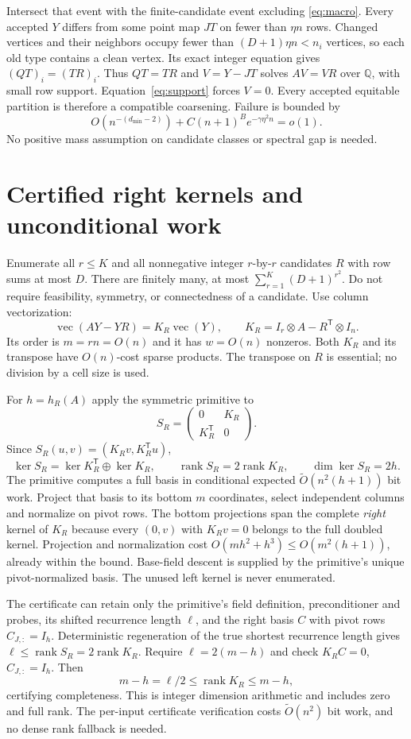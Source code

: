 \documentclass[11pt]{article}
\newcommand{\rank}{\operatorname{rank}}
\begin{document}
Intersect that event with the finite-candidate event excluding \eqref{eq:macro}. Every accepted $Y$ differs from some point map $JT$ on fewer than $\eta n$ rows. Changed vertices and their neighbors occupy fewer than $(D+1)\eta n<n_i$ vertices, so each old type contains a clean vertex. Its exact integer equation gives $(QT)_i=(TR)_i$. Thus $QT=TR$ and $V=Y-JT$ solves $AV=VR$ over $\mathbb Q$, with small row support. Equation~\eqref{eq:support} forces $V=0$. Every accepted equitable partition is therefore a compatible coarsening. Failure is bounded by
\[
 O(n^{-(d_{\min}-2)})+C(n+1)^B e^{-\gamma\eta^2n}=o(1).
\]
No positive mass assumption on candidate classes or spectral gap is needed.

\section{Certified right kernels and unconditional work}
Enumerate all $r\le K$ and all nonnegative integer $r$-by-$r$ candidates $R$ with row sums at most $D$. There are finitely many, at most $\sum_{r=1}^K(D+1)^{r^2}$. Do not require feasibility, symmetry, or connectedness of a candidate. Use column vectorization:
\[
 \operatorname{vec}(AY-YR)=K_R\operatorname{vec}(Y),\qquad
 K_R=I_r\otimes A-R^{\mathsf T}\otimes I_n.
\]
Its order is $m=rn=O(n)$ and it has $w=O(n)$ nonzeros. Both $K_R$ and its transpose have $O(n)$-cost sparse products. The transpose on $R$ is essential; no division by a cell size is used.

For $h=h_R(A)$ apply the symmetric primitive to
\[
 S_R=\begin{pmatrix}0&K_R\\K_R^{\mathsf T}&0\end{pmatrix}.
\]
Since $S_R(u,v)=(K_Rv,K_R^{\mathsf T}u)$,
\[
 \ker S_R=\ker K_R^{\mathsf T}\oplus\ker K_R,\qquad
 \rank S_R=2\rank K_R,\qquad \dim\ker S_R=2h.
\]
The primitive computes a full basis in conditional expected $\widetilde O(n^2(h+1))$ bit work. Project that basis to its bottom $m$ coordinates, select independent columns and normalize on pivot rows. The bottom projections span the complete \emph{right} kernel of $K_R$ because every $(0,v)$ with $K_Rv=0$ belongs to the full doubled kernel. Projection and normalization cost $O(mh^2+h^3)\le O(m^2(h+1))$, already within the bound. Base-field descent is supplied by the primitive's unique pivot-normalized basis. The unused left kernel is never enumerated.

The certificate can retain only the primitive's field definition, preconditioner and probes, its shifted recurrence length $\ell$, and the right basis $C$ with pivot rows $C_{J,:}=I_h$. Deterministic regeneration of the true shortest recurrence length gives $\ell\le\rank S_R=2\rank K_R$. Require $\ell=2(m-h)$ and check $K_RC=0$, $C_{J,:}=I_h$. Then
\[
 m-h=\ell/2\le\rank K_R\le m-h,
\]
certifying completeness. This is integer dimension arithmetic and includes zero and full rank. The per-input certificate verification costs $\widetilde O(n^2)$ bit work, and no dense rank fallback is needed.
\end{document}
